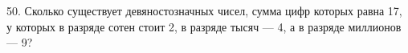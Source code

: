 50. Сколько существует девяностозначных чисел, сумма цифр которых равна 17, у которых в разряде сотен стоит 2, в разряде тысяч --- 4, а в разряде миллионов --- 9?\\
